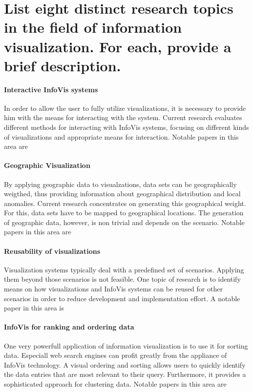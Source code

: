 \section{List eight distinct research topics in the field of information visualization. For
each, provide a brief description.}

\paragraph{Interactive InfoVis systems}
In order to allow the user to fully utilize visualizations, it is necessary to provide him with the means for interacting with the system. Current research evaluates different methods for interacting with InfoVis systems, focusing on different kinds of visualizations and appropriate means for interaction. Notable papers in this area are \cite{research:interaction:tu, research:interaction:lam}

\paragraph{Geographic Visualization}
By applying geographic data to visualzations, data sets can be geographically weigthed, thus providing information about geographical distribution and local anomalies. Current research concentrates on generating this geographical weight. For this, data sets have to be mapped to geographical locations. The generation of geographic data, however, is non trivial and depends on the scenario. Notable papers in this area are \cite{research:geography:dykes, research:geography:fisher}

\paragraph{Reusability of visualizations}
Visualization systems typically deal with a predefined set of scenarios. Applying them beyond those scenarios is not feasible. One topic of research is to identify means on how visualizations and InfoVis systems can be reused for other scenarios in order to reduce development and implementation effort. A notable paper in this area is \cite{research:reuse:humphrey}

\paragraph{InfoVis for ranking and ordering data}
One very powerfull application of information visualization is to use it for sorting data. Especiall web search engines can profit greatly from the appliance of InfoVis technology. A visual ordering and sorting allows users to quickly identify the data entries that are most relevant to their query. Furthermore, it provides a sophisticated approach for clustering data. Notable papers in this area are \cite{research:ranking:kidwell, research:ranking:freiler}

